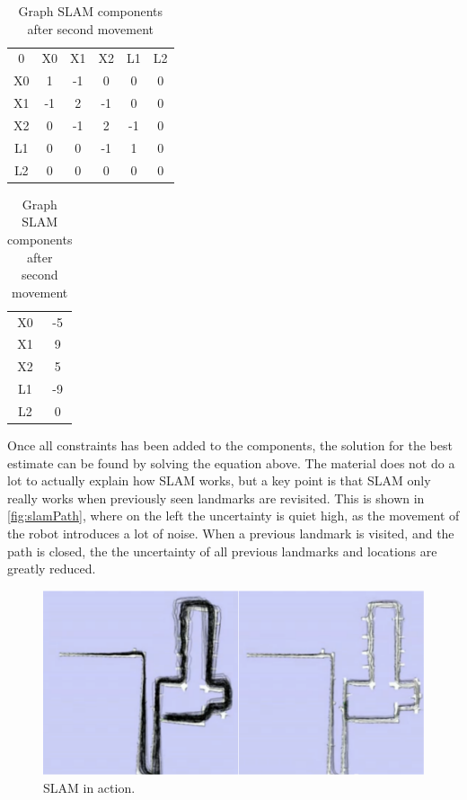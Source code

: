\documentclass[Main]{subfiles}
\begin{document}
\begin{table}[H]
	\begin{subtable}{0.5\linewidth}
		\centering
	\begin{tabular}{cccccc}
		0 & X0 & X1 & X2 & L1 & L2 \\ 
		X0 & 1 & -1 & 0 & 0 & 0  \\ 
		X1 & -1 & 2 & -1 & 0 & 0  \\ 
		X2 & 0 & -1 & 2 & -1 & 0  \\  
		L1 & 0 & 0 & -1 & 1 & 0  \\ 
		L2 & 0 & 0 & 0 & 0 & 0  \\ 
	\end{tabular}
	\caption{$\Omega$ }
	\end{subtable}
	\begin{subtable}{0.5\linewidth}
		\centering
		\begin{tabular}{cc}
			X0 & -5 \\ 
			X1 & 9 \\ 
			X2 & 5 \\ 
			L1 & -9 \\  
			L2 & 0 \\ 
		\end{tabular}
	\caption{$\xi$}
	\end{subtable}
\caption{Graph SLAM components after second movement}
\label{table:secondmovement_graphslamtable} 
\end{table} \noindent

Once all constraints has been added to the components, the solution for the best estimate can be found by solving the equation above.
The material does not do a lot to actually explain how SLAM works, but a key point is that SLAM only really works when previously seen landmarks are revisited. 
This is shown in \autoref{fig:slamPath}, where on the left the uncertainty is quiet high, as the movement of the robot introduces a lot of noise.
When a previous landmark is visited, and the path is closed, the the uncertainty of all previous landmarks and locations are greatly reduced.

\begin{figure}[H]
	\centering
	\includegraphics[width=0.9\linewidth]{./Figures/SLAMpath}
	\caption{SLAM in action.}
	\label{fig:slamPath}
\end{figure}\noindent
\end{document}
